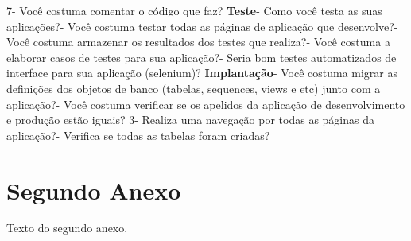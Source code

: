 \begin{anexosenv}
    7- Você costuma comentar o código que faz?\newline
\newline
\textbf{Teste}\newline{}- Como você testa as suas aplicações?- Você costuma testar todas as páginas de aplicação que desenvolve?- Você costuma armazenar os resultados dos testes que realiza?- Você costuma a elaborar casos de testes para sua aplicação?- Seria bom testes automatizados de interface para sua aplicação (selenium)?\newline
\newline
\textbf{Implantação}\newline{}- Você costuma migrar as definições dos objetos de banco (tabelas, sequences, views e etc) junto com a aplicação?- Você costuma verificar se os apelidos da aplicação de desenvolvimento e produção estão iguais?
    3- Realiza uma navegação por todas as páginas da aplicação?- Verifica se todas as tabelas foram criadas?\newline
\newline
\chapter{Segundo Anexo}

Texto do segundo anexo.

\end{anexosenv}

